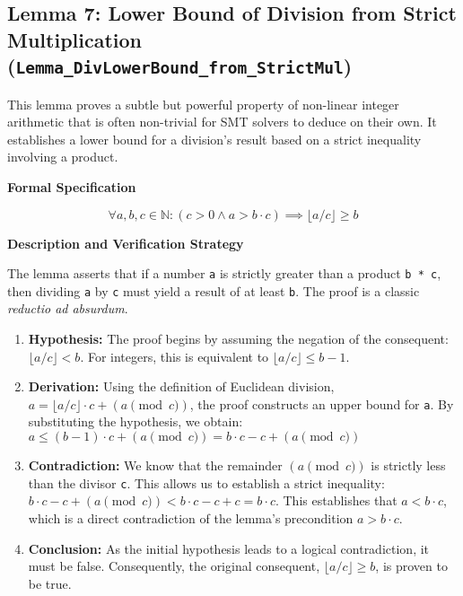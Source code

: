 \documentclass[
  english,
  onecolumn]{article}
\providecommand{\tightlist}{%
  \setlength{\itemsep}{0pt}\setlength{\parskip}{0pt}}
\begin{document}
\subsection{\texorpdfstring{\textbf{Lemma 7: Lower Bound of Division
from Strict Multiplication
(\texttt{Lemma\_DivLowerBound\_from\_StrictMul})}}{Lemma 7: Lower Bound of Division from Strict Multiplication (Lemma\_DivLowerBound\_from\_StrictMul)}}\label{lemma-7-lower-bound-of-division-from-strict-multiplication-lemma_divlowerbound_from_strictmul}

This lemma proves a subtle but powerful property of non-linear integer
arithmetic that is often non-trivial for SMT solvers to deduce on their
own. It establishes a lower bound for a division's result based on a
strict inequality involving a product.

\textbf{Formal Specification}

\[
\forall a, b, c \in \mathbb{N} : (c > 0 \land a > b \cdot c) \implies \lfloor a/c \rfloor \ge b
\]

\textbf{Description and Verification Strategy}

The lemma asserts that if a number \texttt{a} is strictly greater than a
product \texttt{b\ *\ c}, then dividing \texttt{a} by \texttt{c} must
yield a result of at least \texttt{b}. The proof is a classic
\emph{reductio ad absurdum}.

\begin{enumerate}
\def\labelenumi{\arabic{enumi}.}
\tightlist
\item
  \textbf{Hypothesis:} The proof begins by assuming the negation of the
  consequent: \(\lfloor a/c \rfloor < b\). For integers, this is
  equivalent to \(\lfloor a/c \rfloor \le b - 1\).
\item
  \textbf{Derivation:} Using the definition of Euclidean division,
  \(a = \lfloor a/c \rfloor \cdot c + (a \pmod c)\), the proof
  constructs an upper bound for \texttt{a}. By substituting the
  hypothesis, we obtain:
  \(a \le (b - 1) \cdot c + (a \pmod c) = b \cdot c - c + (a \pmod c)\)
\item
  \textbf{Contradiction:} We know that the remainder \((a \pmod c)\) is
  strictly less than the divisor \texttt{c}. This allows us to establish
  a strict inequality:
  \(b \cdot c - c + (a \pmod c) < b \cdot c - c + c = b \cdot c\). This
  establishes that \(a < b \cdot c\), which is a direct contradiction of
  the lemma's precondition \(a > b \cdot c\).
\item
  \textbf{Conclusion:} As the initial hypothesis leads to a logical
  contradiction, it must be false. Consequently, the original
  consequent, \(\lfloor a/c \rfloor \ge b\), is proven to be true.
\end{enumerate}
\end{document}
